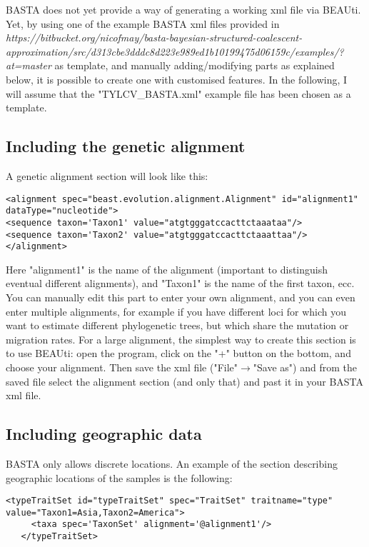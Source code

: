 \documentclass[10pt,letterpaper]{article}
\begin{document}
BASTA does not yet provide a way of generating a working xml file via BEAUti. Yet, by using one of the example BASTA xml files provided in \emph{https://bitbucket.org/nicofmay/basta-bayesian-structured-coalescent-approximation/src/d313cbe3dddc8d223e989ed1b10199475d06159c/examples/?at=master} as template, and manually adding/modifying parts as explained below, it is possible to create one with customised features. 
In the following, I will assume that the "TYLCV\_BASTA.xml" example file has been chosen as a template.

\subsection{Including the genetic alignment}

A genetic alignment section will look like this:

\begin{lstlisting}
<alignment spec="beast.evolution.alignment.Alignment" id="alignment1" dataType="nucleotide">
<sequence taxon='Taxon1' value="atgtgggatccacttctaaataa"/>
<sequence taxon='Taxon2' value="atgtgggatccacttctaaattaa"/>
</alignment>
\end{lstlisting}

Here "alignment1" is the name of the alignment (important to distinguish eventual different alignments), and "Taxon1" is the name of the first taxon, ecc.
You can manually edit this part to enter your own alignment, and you can even enter multiple alignments, for example if you have different loci for which you want to estimate different phylogenetic trees, but which share the mutation or migration rates. For a large alignment, the simplest way to create this section is to use BEAUti: open the program, click on the "+" button on the bottom, and choose your alignment. Then save the xml file ("File"$\rightarrow$"Save as") and from the saved file select the alignment section (and only that) and past it in your BASTA xml file.

\subsection{Including geographic data}

BASTA only allows discrete locations. An example of the section describing geographic locations of the samples is the following:

\begin{lstlisting}
<typeTraitSet id="typeTraitSet" spec="TraitSet" traitname="type" value="Taxon1=Asia,Taxon2=America">
     <taxa spec='TaxonSet' alignment='@alignment1'/>
   </typeTraitSet>
\end{lstlisting}
\end{document}
